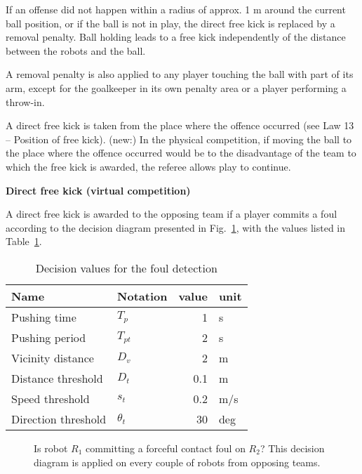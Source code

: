 \bigskip

If an offense did not happen within a radius of approx. 1 m
around the current ball position, or if the ball is not in play,
the direct free kick is replaced by a removal penalty.
Ball holding leads to a free kick independently of the distance between
  the robots and the ball.

\bigskip

A removal penalty is also applied to any player touching the ball with
  part of its arm, except for the goalkeeper in its own penalty area or a player
  performing a throw-in.


\bigskip


A direct free kick is taken from the place where the offence occurred (see Law 13 -- Position of free kick).
(new:) In the physical competition, if moving the ball to the place where the offence occurred would be to the disadvantage of the team to which the free kick is awarded, the referee allows play to continue.

\bigskip

{\bfseries Direct free kick (virtual competition)}

\headlinebox

A direct free kick is awarded to the opposing team if a player commits
a foul according to the decision diagram presented in
Fig.~\ref{fig:forceful_contact}, with the values listed in
Table~\ref{tab:forceful_contact}.

\begin{table}[h]
  \caption{\label{tab:forceful_contact}Decision values for the foul detection}
  \centering
  \begin{tabular}{|l l r l|}
    \hline
    Name & Notation & value & unit\\
    \hline
    Pushing time & $T_p$ & 1 & s\\
    Pushing period & $T_{pt}$ & 2 & s\\
    Vicinity distance & $D_v$ & 2 & m\\
    Distance threshold & $D_t$ & 0.1 & m\\
    Speed threshold & $s_t$ & 0.2 & m/s\\
    Direction threshold & $\theta_t$ & 30 & deg\\
    \hline
  \end{tabular}
\end{table}

\begin{figure}[h]
  \centering
  
  \caption{\label{fig:forceful_contact}
  Is robot $R_1$ committing a forceful contact foul on $R_2$?
  This decision diagram is applied on every couple of robots from opposing
  teams.}
\end{figure}


